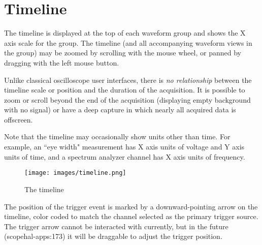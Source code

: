 \chapter{Timeline}

The timeline is displayed at the top of each waveform group and shows the X axis scale for the group. The timeline (and
all accompanying waveform views in the group) may be zoomed by scrolling with the mouse wheel, or panned by dragging
with the left mouse button.

Unlike classical oscilloscope user interfaces, there is \emph{no relationship} between the timeline scale or position
and the duration of the acquisition. It is possible to zoom or scroll beyond the end of the acquisition (displaying
empty background with no signal) or have a deep capture in which nearly all acquired data is offscreen.

Note that the timeline may occasionally show units other than time. For example, an ``eye width" measurement has X axis
units of voltage and Y axis units of time, and a spectrum analyzer channel has X axis units of frequency.


\begin{figure}[h]
\centering
\texttt{[image: images/timeline.png]}
\caption{The timeline}
\label{timeline}
\end{figure}

The position of the trigger event is marked by a downward-pointing arrow on the timeline, color coded to match the
channel selected as the primary trigger source. The trigger arrow cannot be interacted with currently, but in the future
(scopehal-apps:173) it will be draggable to adjust the trigger position.
